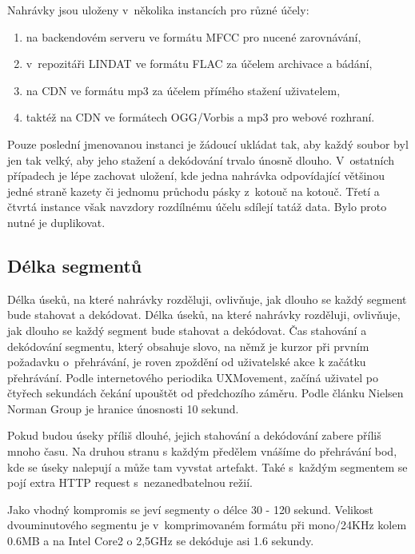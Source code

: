 Nahrávky jsou uloženy v~několika instancích pro různé účely:

\begin{enumerate}
\item{na backendovém serveru ve formátu MFCC pro nucené zarovnávání,}
\item{v~repozitáři LINDAT ve formátu FLAC za účelem archivace a bádání,}
\item{na CDN ve formátu mp3 za účelem přímého stažení uživatelem,}
\item{taktéž na CDN ve formátech OGG/Vorbis a mp3 pro webové rozhraní.}
\end{enumerate}

Pouze poslední jmenovanou instanci je žádoucí ukládat tak, aby každý soubor byl
jen tak velký, aby jeho stažení a dekódování trvalo únosně dlouho. V~ostatních
případech je lépe zachovat uložení, kde jedna nahrávka odpovídající většinou
jedné straně kazety či jednomu průchodu pásky z~kotouč na kotouč. Třetí a čtvrtá
instance však navzdory rozdílnému účelu sdílejí tatáž data. Bylo proto nutné je
duplikovat.

\subsection{Délka segmentů}

Délka úseků, na které nahrávky rozděluji, ovlivňuje, jak dlouho se každý segment
bude stahovat a dekódovat.
Délka úseků, na které nahrávky rozděluji, ovlivňuje, jak dlouho se každý segment
bude stahovat a dekódovat.  Čas stahování a dekódování segmentu, který obsahuje
slovo, na němž je kurzor při prvním požadavku o~přehrávání, je roven zpoždění od
uživatelské akce k začátku přehrávání. Podle internetového periodika
UXMovement\cite{foursecondrule}, začíná uživatel po čtyřech sekundách čekání
upouštět od předchozího záměru. Podle článku Nielsen Norman
Group\cite{websiteresponsetimes} je hranice únosnosti 10 sekund.

Pokud budou úseky příliš dlouhé, jejich stahování a dekódování zabere příliš
mnoho času. Na druhou stranu s každým předělem vnášíme do přehrávání bod, kde se
úseky nalepují a může tam vyvstat artefakt. Také s~každým segmentem se pojí
extra HTTP request s~nezanedbatelnou režií.

Jako vhodný kompromis se jeví segmenty o délce 30 - 120 sekund. Velikost
dvouminutového segmentu je v~komprimovaném formátu při mono/24KHz kolem 0.6MB a
na Intel Core2 o 2,5GHz se dekóduje asi 1.6 sekundy.

